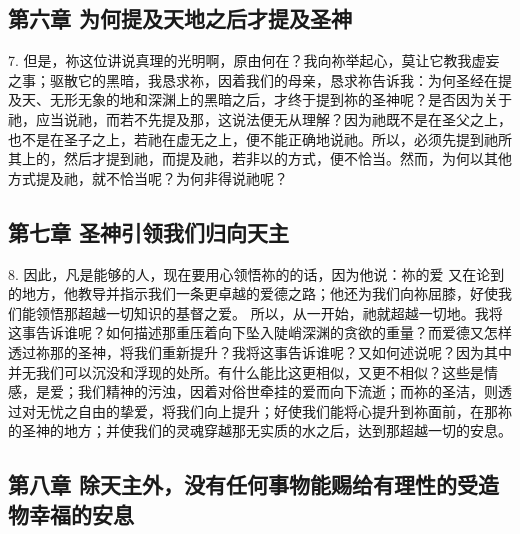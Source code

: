 \subsection{第六章 为何提及天地之后才提及圣神}

7. 但是，祢这位讲说真理的光明啊，原由何在？我向祢举起心，莫让它教我虚妄之事；驱散它的黑暗，我恳求祢，因着我们的母亲，恳求祢告诉我：为何圣经在提及天、无形无象的地和深渊上的黑暗之后，才终于提到祢的圣神呢？是否因为关于祂，应当说祂，而若不先提及那，这说法便无从理解？因为祂既不是在圣父之上，也不是在圣子之上，若祂在虚无之上，便不能正确地说祂。所以，必须先提到祂所其上的，然后才提到祂，而提及祂，若非以的方式，便不恰当。然而，为何以其他方式提及祂，就不恰当呢？为何非得说祂呢？\par


\subsection{第七章 圣神引领我们归向天主}

8. 因此，凡是能够的人，现在要用心领悟祢的的话，因为他说：祢的爱 又在论到的地方，他教导并指示我们一条更卓越的爱德之路；他还为我们向祢屈膝，好使我们能领悟那超越一切知识的基督之爱。 所以，从一开始，祂就超越一切地。我将这事告诉谁呢？如何描述那重压着向下坠入陡峭深渊的贪欲的重量？而爱德又怎样透过祢那的圣神，将我们重新提升？我将这事告诉谁呢？又如何述说呢？因为其中并无我们可以沉没和浮现的处所。有什么能比这更相似，又更不相似？这些是情感，是爱；我们精神的污浊，因着对俗世牵挂的爱而向下流逝；而祢的圣洁，则透过对无忧之自由的挚爱，将我们向上提升；好使我们能将心提升到祢面前，在那祢的圣神的地方；并使我们的灵魂穿越那无实质的水之后，达到那超越一切的安息。\par


\subsection{第八章 除天主外，没有任何事物能赐给有理性的受造物幸福的安息}

